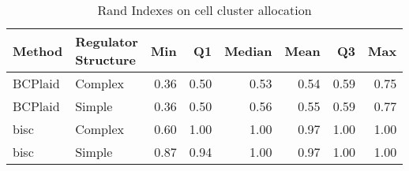 \begin{table}[ht]
\caption{Rand Indexes on cell cluster allocation}
\vspace{1.5cm}
\centering
\begin{tabular}{llrrrrrr}
  \toprule
Method & \makecell{Regulator \\ Structure} & Min & Q1 & Median & Mean & Q3 & Max \\ 
  \midrule
BCPlaid & Complex & 0.36 & 0.50 & 0.53 & 0.54 & 0.59 & 0.75 \\ 
  BCPlaid & Simple & 0.36 & 0.50 & 0.56 & 0.55 & 0.59 & 0.77 \\ 
  bisc & Complex & 0.60 & 1.00 & 1.00 & 0.97 & 1.00 & 1.00 \\ 
  bisc & Simple & 0.87 & 0.94 & 1.00 & 0.97 & 1.00 & 1.00 \\ 
   \bottomrule
\end{tabular}
\end{table}
